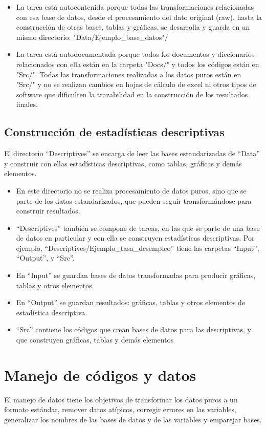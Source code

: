 \begin{itemize}
    \item La tarea está autocontenida porque todas las transformaciones relacionadas con esa base de datos, desde el procesamiento del dato original (raw), hasta la construcción de otras bases, tablas y gráficas, se desarrolla y guarda en un mismo directorio: "Data/Ejemplo\_base\_datos"/	\item  La tarea está autodocumentada porque todos los documentos y diccionarios relacionados con ella están en la carpeta "Docs/" y todos los códigos están en "Src/". Todas las transformaciones realizadas a los datos puros están en "Src/" y no se realizan cambios en hojas de cálculo de excel ni otros tipos de software que dificulten la trazabilidad en la construcción de los resultados finales.
\end{itemize}


\subsection{Construcción de estadísticas descriptivas}
El directorio “Descriptives” se encarga de leer las bases estandarizadas de “Data” y construir con ellas estadísticas descriptivas, como tablas, gráficas y demás elementos. 
\begin{itemize}
    \item En este directorio no se realiza procesamiento de datos puros, sino que se parte de los datos estandarizados, que pueden seguir transformándose para construir resultados.
    \item “Descriptives” también se compone de tareas, en las que se parte de una base de datos en particular y con ella se construyen estadísticas descriptivas. Por ejemplo, “Descriptives/Ejemplo\_tasa\_desempleo” tiene las carpetas “Input”, “Output”, y “Src”.
    \item En “Input” se guardan bases de datos transformadas para producir gráficas, tablas y otros elementos.
    \item En “Output” se guardan resultados: gráficas, tablas y otros elementos de estadística descriptiva.
    \item “Src” contiene los códigos que crean bases de datos para las descriptivas, y que construyen gráficas, tablas y demás elementos
\end{itemize}


\section{Manejo de códigos y datos}
El manejo de datos tiene los objetivos de transformar los datos puros a un formato estándar, remover datos atípicos, corregir errores en las variables, generalizar los nombres de las bases de datos y de las variables y emparejar bases.

